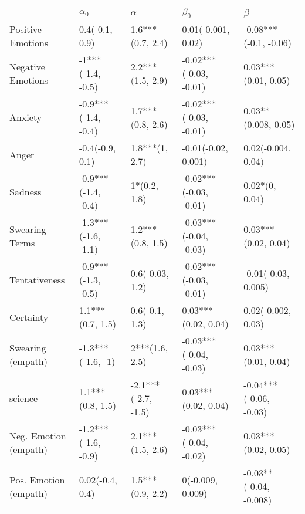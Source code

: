\begin{tabular}{lllll}
\toprule
{} &           $\alpha_0$ &             $\alpha$ &               $\beta_0$ &                 $\beta$ \\
\midrule
Positive Emotions     &       0.4(-0.1, 0.9) &     1.6***(0.7, 2.4) &      0.01(-0.001, 0.02) &   -0.08***(-0.1, -0.06) \\
Negative Emotions     &    -1***(-1.4, -0.5) &     2.2***(1.5, 2.9) &  -0.02***(-0.03, -0.01) &     0.03***(0.01, 0.05) \\
Anxiety               &  -0.9***(-1.4, -0.4) &     1.7***(0.8, 2.6) &  -0.02***(-0.03, -0.01) &     0.03**(0.008, 0.05) \\
Anger                 &      -0.4(-0.9, 0.1) &       1.8***(1, 2.7) &     -0.01(-0.02, 0.001) &      0.02(-0.004, 0.04) \\
Sadness               &  -0.9***(-1.4, -0.4) &         1*(0.2, 1.8) &  -0.02***(-0.03, -0.01) &          0.02*(0, 0.04) \\
Swearing Terms        &  -1.3***(-1.6, -1.1) &     1.2***(0.8, 1.5) &  -0.03***(-0.04, -0.03) &     0.03***(0.02, 0.04) \\
Tentativeness         &  -0.9***(-1.3, -0.5) &      0.6(-0.03, 1.2) &  -0.02***(-0.03, -0.01) &     -0.01(-0.03, 0.005) \\
Certainty             &     1.1***(0.7, 1.5) &       0.6(-0.1, 1.3) &     0.03***(0.02, 0.04) &      0.02(-0.002, 0.03) \\
Swearing (empath)     &    -1.3***(-1.6, -1) &       2***(1.6, 2.5) &  -0.03***(-0.04, -0.03) &     0.03***(0.01, 0.04) \\
science               &     1.1***(0.8, 1.5) &  -2.1***(-2.7, -1.5) &     0.03***(0.02, 0.04) &  -0.04***(-0.06, -0.03) \\
Neg. Emotion (empath) &  -1.2***(-1.6, -0.9) &     2.1***(1.5, 2.6) &  -0.03***(-0.04, -0.02) &     0.03***(0.02, 0.05) \\
Pos. Emotion (empath) &      0.02(-0.4, 0.4) &     1.5***(0.9, 2.2) &        0(-0.009, 0.009) &  -0.03**(-0.04, -0.008) \\
\bottomrule
\end{tabular}
